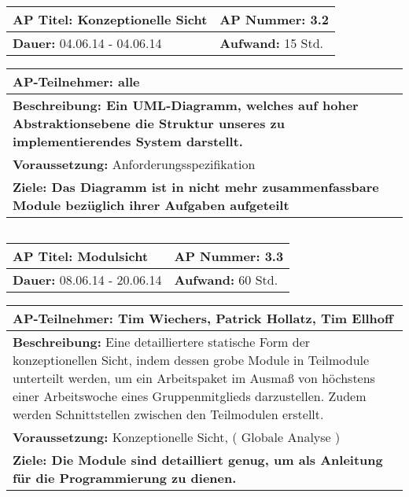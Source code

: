 \begin{tabular}{|p{7.43cm}|p{7.43cm}|}
\hline
\textbf{AP Titel: }Konzeptionelle Sicht & \textbf{AP Nummer: }3.2\\ 
\hline
\textbf{Dauer: }04.06.14 - 04.06.14& \textbf{Aufwand: }15 Std.\\
\hline
\end{tabular}
\begin{tabular}{|p{15.3cm}|}
\hline
\textbf{AP-Teilnehmer: }alle\\
\hline
\textbf{Beschreibung: Ein UML-Diagramm, welches auf hoher Abstraktionsebene
die Struktur unseres zu implementierendes System darstellt.}\\
\hline
\textbf{Voraussetzung: }Anforderungsspezifikation\\
\hline 
\textbf{Ziele: Das Diagramm ist in nicht mehr zusammenfassbare Module bezüglich ihrer
Aufgaben aufgeteilt}\\
\hline 
\end{tabular}
\begin{verbatim}

\end{verbatim}

\begin{tabular}{|p{7.43cm}|p{7.43cm}|}
\hline
\textbf{AP Titel: }Modulsicht & \textbf{AP Nummer: }3.3\\ 
\hline
\textbf{Dauer: }08.06.14 - 20.06.14& \textbf{Aufwand: }60 Std.\\
\hline
\end{tabular}
\begin{tabular}{|p{15.3cm}|}
\hline
\textbf{AP-Teilnehmer: }Tim Wiechers, Patrick Hollatz, Tim Ellhoff\\
\hline
\textbf{Beschreibung: }Eine detailliertere statische Form der konzeptionellen Sicht, indem dessen grobe Module in Teilmodule unterteilt werden, um ein Arbeitspaket im Ausmaß von höchstens einer Arbeitswoche eines Gruppenmitglieds darzustellen. Zudem werden Schnittstellen
zwischen den Teilmodulen erstellt. \\
\hline
\textbf{Voraussetzung: }Konzeptionelle Sicht, ( Globale Analyse )\\
\hline 
\textbf{Ziele: Die Module sind detailliert genug, um als Anleitung für die Programmierung zu dienen.}\\
\hline 
\end{tabular}
\begin{verbatim}

\end{verbatim}


